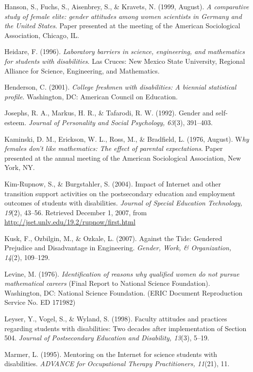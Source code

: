 \documentclass[11.5pt]{sig-alternate} %
\begin{document}
Hanson, S., Fuchs, S., Aisenbrey, S., \& Kravets, N. (1999, August). \textit{A comparative study of female elite: gender attitudes among women scientists in Germany and the United States}. Paper presented at the meeting of the American Sociological Association, Chicago, IL. 
 
Heidare, F. (1996). \textit{Laboratory barriers in science, engineering, and mathematics for students with disabilities}. Las Cruces: New Mexico State University, Regional Alliance for Science, Engineering, and Mathematics.  
 
Henderson, C. (2001). \textit{College freshmen with disabilities: A biennial statistical profile}. Washington, DC: American Council on Education. 
 
Josephs, R. A., Markus, H. R., \& Tafarodi, R. W. (1992). Gender and self-esteem. \textit{Journal of Personality and Social Psychology, 63}(3), 391–403.  
 
Kaminski, D. M., Erickson, W. L., Ross, M., \& Bradfield, L. (1976, August). W\textit{hy females don’t like mathematics: The effect of parental expectations}. Paper presented at the annual meeting of the American Sociological Association, New York, NY.  
 
Kim-Rupnow, S., \& Burgstahler, S. (2004). Impact of Internet and other transition support activities on the postsecondary education and employment outcomes of students with disabilities. \textit{Journal of Special Education Technology, 19}(2), 43–56. Retrieved December 1, 2007, from \url{http://jset.unlv.edu/19.2/rupnow/first.html}
 
Kusk, F., Ozbilgin, M., \& Ozkale, L. (2007). Against the Tide: Gendered Prejudice and Disadvantage in Engineering. \textit{Gender, Work, \& Organization, 14}(2), 109–129.  
 
Levine, M. (1976). \textit{Identification of reasons why qualified women do not pursue mathematical careers} (Final Report to National Science Foundation). Washington, DC: National Science Foundation. (ERIC Document Reproduction Service No. ED 171982)  
 
Leyser, Y., Vogel, S., \& Wyland, S. (1998). Faculty attitudes and practices regarding students with disabilities: Two decades after implementation of Section 504. \textit{Journal of Postsecondary Education and Disability, 13}(3), 5–19. 
 
Marmer, L. (1995). Mentoring on the Internet for science students with disabilities. \textit{ADVANCE for Occupational Therapy Practitioners, 11}(21), 11. 
 
\end{document}
